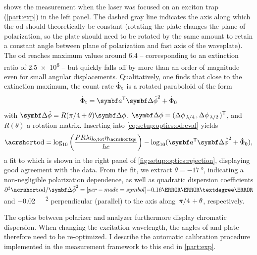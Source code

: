  shows the measurement when the laser was focused on an exciton trap (\cf \cref{part:exp}) in the left panel.
The dashed gray line indicates the axis along which the \gls{od} should theoretically be constant (rotating the \halfwave plate changes the plane of polarization, so the \quarterwave plate should need to be rotated by the same amount to retain a constant angle between plane of polarization and fast axis of the waveplate).
The \gls{od} reaches maximum values around \num{6.4} -- corresponding to an extinction ratio of \num{2.5e6} -- but quickly falls off by more than an order of magnitude even for small angular displacements.
Qualitatively, one finds that close to the extinction maximum, the count rate $\dot{\Phi}_{\mathrm{t}}$ is a rotated paraboloid of the form
\begin{equation}
    \dot{\Phi}_{\mr{t}} = \bvec{a}\transpose\bvec{\Delta\tilde{\phi}}^2 + \dot{\Phi}_0
\end{equation}
with $\bvec{\Delta\tilde{\phi}} = R(\pi/4+\theta)\bvec{\Delta\phi}$, $\bvec{\Delta\phi} = (\Delta\phi_{\quarterwave},\Delta\phi_{\halfwave})\transpose$, and $R(\theta)$ a rotation matrix.
Inserting into \cref{eq:setup:optics:od:eval} yields
\begin{equation}\label{eq:setup:optics:od:fit}
    \OD = \log_{10}\left(\frac{P R\lambda\eta_{\mr{o,tot}}\eta_{\QE}}{h c}\right) - \log_{10}(\bvec{a}\transpose\bvec{\Delta\tilde{\phi}}^2 + \dot{\Phi}_0),
\end{equation}
a fit to which is shown in the right panel of \cref{fig:setup:optics:rejection}, displaying good agreement with the data.
From the fit, we extract $\theta=\qty{-17}{\degree}$, indicating a non-negligible polarization dependence, as well as quadratic dispersion coefficients $\partial^2\OD/\bvec{\Delta\tilde{\phi}}^2=\qty[per-mode=symbol]{-0.16}{\per\milli\textdegree\squared}$ and \qty[per-mode=symbol]{-0.02}{\per\milli\textdegree\squared} perpendicular (parallel) to the axis along $\flatfrac{\pi}{4}+\theta$, respectively.

The optics between polarizer and analyzer furthermore display chromatic dispersion.
When changing the excitation wavelength, the angles of \halfwave and \quarterwave plate therefore need to be re-optimized.
I describe the automatic calibration procedure implemented in the measurement framework to this end in \cref{part:exp}.

